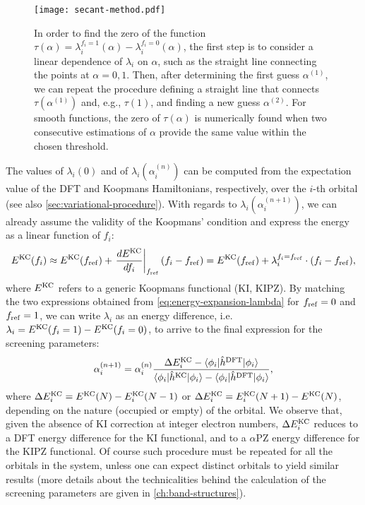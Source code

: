 \begin{figure}
    \centering
    \texttt{[image: secant-method.pdf]}
    \caption[Secant method to determine the screening parameters]{In order to find the zero of the function $\tau(\alpha) = \lambda_i^{f_i=1}(\alpha) - \lambda_i^{f_i=0}(\alpha)$, the first step is to consider a linear dependence of $\lambda_i$ on $\alpha$, such as the straight line connecting the points at $\alpha=0,1$. Then, after determining the first guess $\alpha^{(1)}$, we can repeat the procedure defining a straight line that connects $\tau(\alpha^{(1)})$ and, e.g., $\tau(1)$, and finding a new guess $\alpha^{(2)}$. For smooth functions, the zero of $\tau(\alpha)$ is numerically found when two consecutive estimations of $\alpha$ provide the same value within the chosen threshold.}
    \label{fig:secant-method}
\end{figure}

The values of $\lambda_i(0)$ and of $\lambda_i(\alpha_i^{(n)})$ can be computed from the expectation value of the DFT and Koopmans Hamiltonians, respectively, over the $i$-th orbital (see also \cref{sec:variational-procedure}). With regards to $\lambda_i(\alpha_i^{(n+1)})$, we can already assume the validity of the Koopmans' condition and express the energy as a linear function of $f_i$:
%
\begin{equation}
    E^{\rm KC}(f_i) \approx E^{\rm KC}(f_{\rm ref}) + \left. \frac{dE^{\rm KC}}{df_i} \right|_{f_{\rm ref}} (f_i-f_{\rm ref}) =
    E^{\rm KC}(f_{\rm ref}) + \lambda_i^{f_i=f_{\rm ref}} \cdot (f_i-f_{\rm ref}) ,
    \label{eq:energy-expansion-lambda}
\end{equation}
%
where $E^{\rm KC}$ refers to a generic Koopmans functional (KI, KIPZ). By matching the two expressions obtained from \cref{eq:energy-expansion-lambda} for $f_{\rm ref} = 0$ and $f_{\rm ref} = 1$, we can write $\lambda_i$ as an energy difference, i.e. $\lambda_i = E^{\rm KC}(f_i=1) - E^{\rm KC}(f_i=0)$, to arrive to the final expression for the screening parameters:
%
\begin{equation}
    \alpha_i^{(n+1)} = \alpha_i^{(n)} \frac{\Delta E^{\rm KC}_i - \braket{\phi_i|\hat{h}^{\rm DFT}|\phi_i}}{\braket{\phi_i|\hat{h}^{\rm KC}|\phi_i} - \braket{\phi_i|\hat{h}^{\rm DFT}|\phi_i}} ,
    \label{eq:screening-parameter-iterative}
\end{equation}
%
where $\Delta E^{\rm KC}_i = E^{\rm KC}(N) - E^{\rm KC}_i(N-1)$ or $\Delta E^{\rm KC}_i = E^{\rm KC}_i(N+1) - E^{\rm KC}(N)$, depending on the nature (occupied or empty) of the orbital. We observe that, given the absence of KI correction at integer electron numbers, $\Delta E^{\rm KC}_i$ reduces to a DFT energy difference for the KI functional, and to a $\alpha$PZ energy difference for the KIPZ functional. Of course such procedure must be repeated for all the orbitals in the system, unless one can expect distinct orbitals to yield similar results (more details about the technicalities behind the calculation of the screening parameters are given in \cref{ch:band-structures}).

